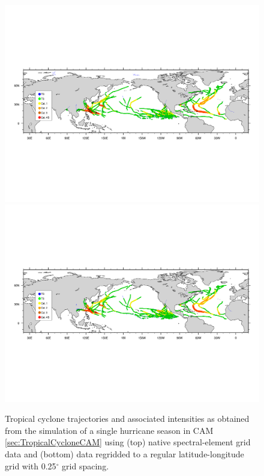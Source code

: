 \documentclass[gmdd, hvmath]{copernicus}
\begin{document}
\begin{figure}
\begin{center}
\includegraphics[clip, trim=0.2cm 6.6cm 0.2cm 7.1cm, width=5in]{nhemi-traj_plotted.pdf}
\includegraphics[clip, trim=0.2cm 6.8cm 0.2cm 7.1cm, width=5in]{nhemi_regrid-traj_plotted.pdf}
\end{center}
\caption{Tropical cyclone trajectories and associated intensities as obtained from the simulation of a single hurricane season in CAM \ref{sec:TropicalCycloneCAM} using (top) native spectral-element grid data and (bottom) data regridded to a regular latitude-longitude grid with 0.25$^\circ$ grid spacing.} \label{fig:TropicalCycloneCAM}
\end{figure}
\end{document}
